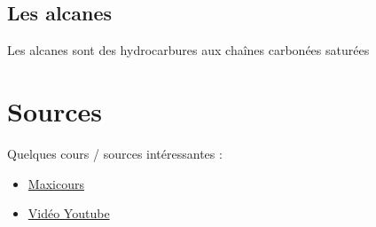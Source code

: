 \documentclass{article}
\begin{document}
\subsection{Les alcanes}

Les alcanes sont des hydrocarbures aux chaînes carbonées saturées


\section{Sources}

Quelques cours / sources intéressantes : 

\begin{itemize}[noitemsep]
  \item \href{https://www.maxicours.com/se/cours/etablir-le-schema-de-lewis-et-la-geometrie-d-une-molecule/}{Maxicours}
  \item \href{https://www.youtube.com/watch?v=bmV-Tbv2Me8&ab_channel=e-profs-PhysiqueChimie}{Vidéo Youtube}
\end{itemize}
\end{document}
